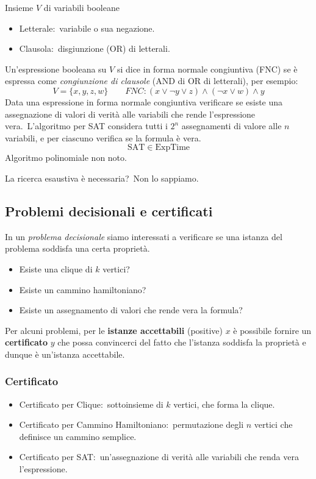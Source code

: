 Insieme $V$ di variabili booleane
\begin{itemize}
    \item Letterale:\ variabile o sua negazione.
    \item Clausola:\ disgiunzione (OR) di letterali.
\end{itemize}
Un'espressione booleana su $V$ si dice in forma normale congiuntiva (FNC) se è espressa come \textit{congiunzione di clausole} (AND di OR di letterali), per esempio:
\[V = \{x,y,z,w\}\qquad \mathit{FNC}: (x \lor \neg y \lor z) \land (\neg x \lor w) \land y\]
Data una espressione in forma normale congiuntiva verificare se esiste una assegnazione di valori di verità alle variabili che rende l'espressione vera.\
L'algoritmo per SAT considera tutti i $2^n$ assegnamenti di valore alle $n$ variabili, e per ciascuno verifica se la formula è vera.\
\[\mathrm{SAT} \in \mathrm{ExpTime}\]
Algoritmo polinomiale non noto.\

\vspace{12pt}
\noindent La ricerca esaustiva è necessaria?\
Non lo sappiamo.\

\subsection{Problemi decisionali e certificati}
In un \textit{problema decisionale} siamo interessati a verificare se una istanza del problema soddisfa una certa proprietà.
\begin{itemize}
    \item Esiste una clique di $k$ vertici?
    \item Esiste un cammino hamiltoniano?
    \item Esiste un assegnamento di valori che rende vera la formula?
\end{itemize}
Per alcuni problemi, per le \textbf{istanze accettabili} (positive) $x$ è possibile fornire un \textbf{certificato} $y$ che possa convincerci del fatto che l'istanza soddisfa la proprietà e dunque è un'istanza accettabile.\

\subsubsection{Certificato}

\begin{itemize}
    \item Certificato per Clique:\ sottoinsieme di $k$ vertici, che forma la clique.\
    \item Certificato per Cammino Hamiltoniano:\ permutazione degli $n$ vertici che definisce un cammino semplice.\
    \item Certificato per SAT:\ un'assegnazione di verità alle variabili che renda vera l'espressione.\
\end{itemize}

